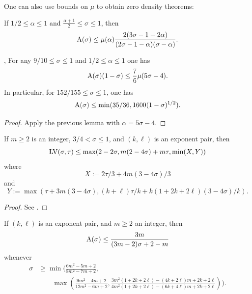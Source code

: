 One can also use bounds on $\mu$ to obtain zero density theorems:

\begin{lemma}\label{zero_from_mu}\cite[Theorem 12.3]{montgomery_topics_1971} If $1/2 \leq \alpha \leq 1$ and $\frac{\alpha+1}{2} \leq \sigma \leq 1$, then
$$ \mathrm{A}(\sigma) \leq \mu(\alpha) \frac{2(3\sigma-1-2\alpha)}{(2\sigma-1-\alpha)(\sigma-\alpha)}.$$
\end{lemma}

\begin{corollary}\label{ivic-zero-density-large}\cite{montgomery_topics_1971}, \cite[Theorem 11.3]{ivic} For any $9/10 \leq \sigma \leq 1$ and $1/2 \leq \alpha \leq 1$ one has
    $$ \mathrm{A}(\sigma)(1-\sigma) \leq \frac{7}{6} \mu(5\sigma-4).$$
In particular, for $152/155 \leq \sigma \leq 1$, one has
$$ \mathrm{A}(\sigma) \leq \min( 35/36, 1600 (1-\sigma)^{1/2} ).$$
\end{corollary}

\literature
{}

\begin{proof} Apply the previous lemma with $\alpha = 5\sigma-4$.
\end{proof}

\begin{lemma}\label{a-ivt-1}  If $m \geq 2$ is an integer, $3/4 < \sigma \leq 1$, and $(k,\ell)$ is an exponent pair, then
$$ \mathrm{LV}(\sigma,\tau) \leq \max( 2-2\sigma, m(2-4\sigma) + m\tau, \min( X, Y ))$$
where
$$ X := 2\tau/3 + 4m(3-4\sigma)/3$$
and
$$ Y := \max( \tau + 3m(3-4\sigma), (k+\ell)\tau/k + k(1+2k+2\ell)(3-4\sigma)/k).$$
\end{lemma}

\begin{proof}  See \cite[(11.74)]{ivic}.
\end{proof}

\begin{lemma}\label{gzd}\cite[(11.76), (11.77)]{ivic} If $(k,\ell)$ is an exponent pair, and $m \geq 2$ an integer, then
$$ \mathrm{A}(\sigma) \leq \frac{3m}{(3m-2)\sigma + 2 - m}$$
whenever
\begin{align*}
\sigma &\geq \min\biggl( \frac{6m^2-5m+2}{8m^2-7m+2},\\
&\qquad \max\left( \frac{9m^2-4m+2}{12m^2-6m+2}, \frac{3m^2(1+2k+2\ell)-(4k+2\ell)m + 2k+2\ell}{4m^2(1+2k+2\ell)-(6k+4\ell)m + 2k+2\ell} \right) \biggr).
\end{align*}
\end{lemma}

